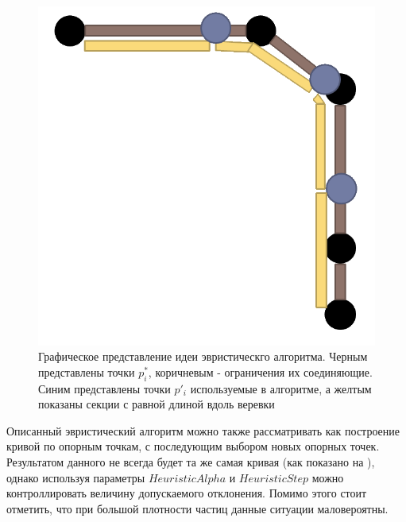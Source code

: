 	\begin{figure}[ht!] 
		\center
		\includegraphics [scale=0.4] {my_folder/images//heuristicSchema}
		\caption{Графическое представление идеи эвристическго алгоритма. Черным представлены точки $p^*_i$, коричневым - ограничения их соединяющие. Синим представлены точки $p'_i$ используемые в алгоритме, а желтым показаны секции с равной длиной вдоль веревки}
		\label{fig:heuristicSchema}  
	\end{figure}	
	\FloatBarrier 
	
	Описанный эвристический алгоритм можно также рассматривать как построение кривой по опорным точкам, с последующим выбором новых опорных точек. Результатом данного  не всегда будет та же самая кривая (как показано на ), однако используя параметры $HeuristicAlpha$ и $HeuristicStep$ можно контроллировать величину допускаемого отклонения. Помимо этого стоит отметить, что при большой плотности частиц данные ситуации маловероятны.
	
